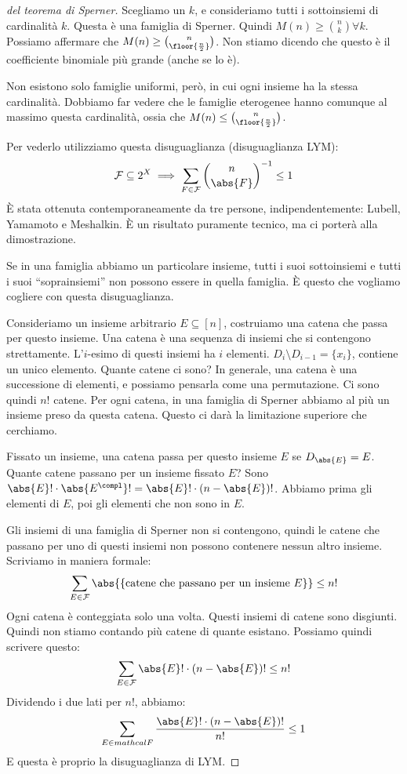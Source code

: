 \begin{proof}[del teorema di Sperner]
	Scegliamo un $k$, e consideriamo tutti i sottoinsiemi di cardinalit\`a $k$.
	Questa \`e una famiglia di Sperner.
	Quindi $M(n) \ge \binom{n}{k} \forall k$.
	Possiamo affermare che $M(n) \ge \binom{n}{\floor{\frac{n}{2}}}$.
	Non stiamo dicendo che questo \`e il coefficiente binomiale pi\`u grande (anche se lo \`e).

	Non esistono solo famiglie uniformi, per\`o, in cui ogni insieme ha la stessa cardinalit\`a.
	Dobbiamo far vedere che le famiglie eterogenee hanno comunque al massimo questa cardinalit\`a, ossia che $M(n) \le \binom{n}{\floor{\frac{n}{2}}}$.

	Per vederlo utilizziamo questa disuguaglianza (disuguaglianza LYM):
	\[
		\mathcal{F} \subseteq 2^X \implies \sum_{F \in \mathcal{F}} \binom{n}{\abs{F}}^{-1} \le 1
	\]
	\`E stata ottenuta contemporaneamente da tre persone, indipendentemente: Lubell, Yamamoto e Meshalkin.
	\`E un risultato puramente tecnico, ma ci porter\`a alla dimostrazione.

	Se in una famiglia abbiamo un particolare insieme, tutti i suoi sottoinsiemi e tutti i suoi ``soprainsiemi'' non possono essere in quella famiglia.
	\`E questo che vogliamo cogliere con questa disuguaglianza.

	Consideriamo un insieme arbitrario $E \subseteq [n]$, costruiamo una catena che passa per questo insieme.
	Una catena \`e una sequenza di insiemi che si contengono strettamente.
	L'$i$-esimo di questi insiemi ha $i$ elementi.
	$D_i \setminus D_{i-1} = \{ x_i \}$, contiene un unico elemento.
	Quante catene ci sono?
	In generale, una catena \`e una successione di elementi, e possiamo pensarla come una permutazione.
	Ci sono quindi $n!$ catene.
	Per ogni catena, in una famiglia di Sperner abbiamo al pi\`u un insieme preso da questa catena.
	Questo ci dar\`a la limitazione superiore che cerchiamo.

	Fissato un insieme, una catena passa per questo insieme $E$ se $D_{\abs{E}} = E$.
	Quante catene passano per un insieme fissato $E$?
	Sono $\abs{E}! \cdot \abs{E^{\compl}}! = \abs{E}! \cdot (n - \abs{E})!$.
	Abbiamo prima gli elementi di $E$, poi gli elementi che non sono in $E$.

	Gli insiemi di una famiglia di Sperner non si contengono, quindi le catene che passano per uno di questi insiemi non possono contenere nessun altro insieme.
	Scriviamo in maniera formale:
	\[
		\sum_{E \in \mathcal{F}} \abs{\{ \text{catene che passano per un insieme } E \}} \le n!
	\]
	Ogni catena \`e conteggiata solo una volta.
	Questi insiemi di catene sono disgiunti.
	Quindi non stiamo contando pi\`u catene di quante esistano.
	Possiamo quindi scrivere questo:
	\[
		\sum_{E \in \mathcal{F}} \abs{E}! \cdot (n - \abs{E})! \le n!
	\]
	Dividendo i due lati per $n!$, abbiamo:
	\[
		\sum_{E \in mathcal{F}} \frac{\abs{E}! \cdot (n - \abs{E})!}{n!} \le 1
	\]
	E questa \`e proprio la disuguaglianza di LYM.


\end{proof}
